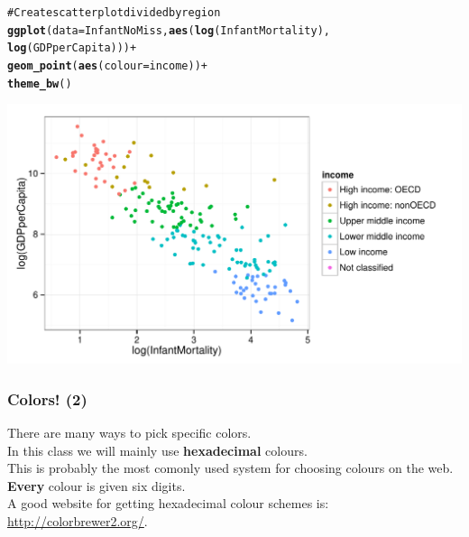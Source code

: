 \documentclass{beamer}\usepackage{graphicx, color}
\makeatletter
\def\maxwidth{ %
  \ifdim\Gin@nat@width>\linewidth
    \linewidth
  \else
    \Gin@nat@width
  \fi
}
\newcommand{\hlfunctioncall}[1]{\textcolor[rgb]{0.501960784313725,0,0.329411764705882}{\textbf{#1}}}%
\newcommand{\hlcomment}[1]{\textcolor[rgb]{0.180392156862745,0.6,0.341176470588235}{#1}}%
\newenvironment{kframe}{%
 \def\at@end@of@kframe{}%
 \ifinner\ifhmode%
  \def\at@end@of@kframe{\end{minipage}}%
  \begin{minipage}{\columnwidth}%
 \fi\fi%
 \def\FrameCommand##1{\hskip\@totalleftmargin \hskip-\fboxsep
 \colorbox{shadecolor}{##1}\hskip-\fboxsep
     \hskip-\linewidth \hskip-\@totalleftmargin \hskip\columnwidth}%
 \MakeFramed {\advance\hsize-\width
   \@totalleftmargin\z@ \linewidth\hsize
   \@setminipage}}%
 {\par\unskip\endMakeFramed%
 \at@end@of@kframe}
\newenvironment{knitrout}{}{} %
\makeatother
\begin{document}
\begin{frame}
\begin{knitrout}
\color{fgcolor}\begin{kframe}
\begin{alltt}
\hlcomment{# Create scatter plot divided by region}
\hlfunctioncall{ggplot}(data = InfantNoMiss, \hlfunctioncall{aes}(\hlfunctioncall{log}(InfantMortality),
                                \hlfunctioncall{log}(GDPperCapita))) +
      \hlfunctioncall{geom_point}(\hlfunctioncall{aes}(colour = income)) + 
      \hlfunctioncall{theme_bw}()
\end{alltt}
\end{kframe}

{\centering \includegraphics[width=\maxwidth]{figure/ScatterColour1} 

}


\end{knitrout}

\end{frame}

\begin{frame}[fragile]
  \frametitle{Colors! (2)}
  There are many ways to pick specific colors. \\[0.5cm]
  In this class we will mainly use {\bf{hexadecimal}} colours. \\[0,25cm]
  This is probably the most comonly used system for choosing colours on the web.\\[0.5cm]
  {\bf{Every}} colour is given six digits. \\[0.25cm]
  A good website for getting hexadecimal colour schemes is: \url{http://colorbrewer2.org/}.
\end{frame}
\end{document}
